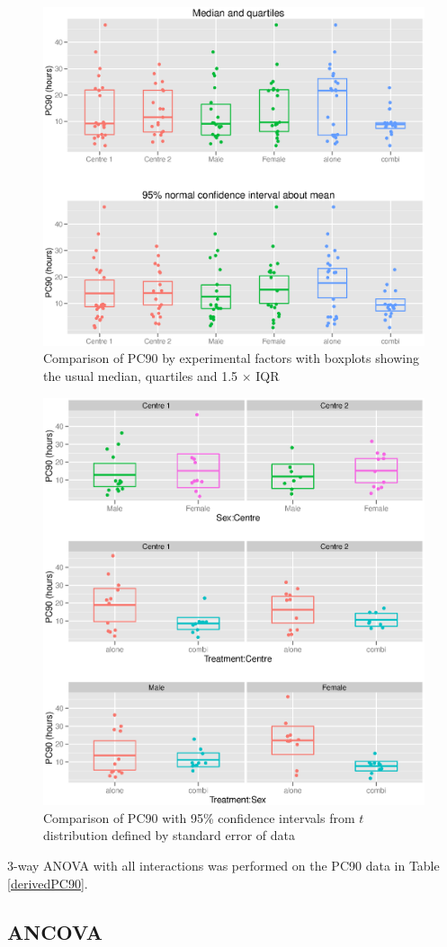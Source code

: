 \begin{figure}[h]
\includegraphics[width=6.5in]{pc90boxes.eps} 
\caption{Comparison of PC90 by experimental factors with boxplots showing the usual median, quartiles and 1.5 $\times$ IQR}
\label{aov-box}
\end{figure}
\begin{figure}[h]
\includegraphics[width=6.5in]{pc90interaction.eps} 
\caption{Comparison of PC90 with 95\% confidence intervals from $t$ distribution defined by standard error of data}
\label{aov-t}
\end{figure}
3-way ANOVA with all interactions was performed on the PC90 data in Table \ref{derivedPC90}.

\subsection{ANCOVA}